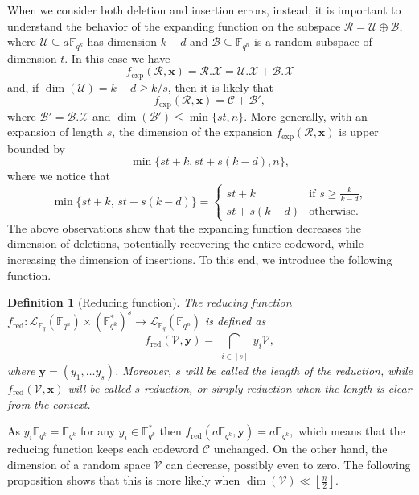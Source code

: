 \documentclass{article}
\newtheorem{definition}{Definition}
\newcommand{\Fq}{\mathbb{F}_{q}}
\newcommand{\Fqn}{\mathbb{F}_{q^n}}
\newcommand{\Fqk}{\mathbb{F}_{q^k}}
\newcommand{\calB}{\mathcal{B}}
\newcommand{\calC}{\mathcal{C}}
\newcommand{\calL}{\mathcal{L}}
\newcommand{\calR}{\mathcal{R}}
\newcommand{\calU}{\mathcal{U}}
\newcommand{\calV}{\mathcal{V}}
\newcommand{\calX}{\mathcal{X}}
\newcommand{\fred}{f_{\mathrm{red}}}
\newcommand{\fexp}{f_{\mathrm{exp}}}
\begin{document}
\par When we consider both deletion and insertion errors, instead, it is important to understand the behavior of the expanding function on the subspace 
$
    \calR = \calU \oplus \calB,
$
where $\calU \subseteq a\Fqk$ has dimension $k-d$ and $\calB \subseteq \Fqn$ is a random subspace of dimension $t.$
In this case we have
$$
    \fexp(\calR, \bm x) = \calR .\calX = \calU.\calX + \calB.\calX
$$
and, if $\dim(\calU) = k-d \geq k/s$, then it is likely that
$$
   \fexp(\calR,\bm x) =\calC + \calB',
$$
where $\calB'=\calB.\calX $ and $\dim(\calB') \leq \min \{st, n \}.$ 
More generally, with an expansion of length $s$, the dimension of the expansion $\fexp(\calR, \bm x)$ is upper bounded by
\begin{equation}
    \label{eq: dim_exp}
    \min\{ st + k, st + s(k-d), n\},
\end{equation}
where we notice that
\begin{equation}
    \label{eq: min upper bound on dimension of expansion}
    \min\{st + k,\, st + s(k-d)\}
=
\begin{cases}
st + k & \text{if } s \ge \frac{k}{k-d}, \\
st + s(k-d) & \text{otherwise}.
\end{cases}
\end{equation}
The above observations show that the expanding function decreases the dimension of deletions, potentially recovering the entire codeword, while increasing the dimension of insertions. To this end, we introduce the following function.
\begin{definition}[Reducing function]
    The reducing function 
\(
\fred:\calL_{\Fq}(\Fqn)\times (\Fqk^*)^s\longrightarrow \calL_{\Fq}(\Fqn)
\)
is defined as
\[
\fred(\calV,\bm y)
   = \bigcap_{\substack{i\in [s]}} y_i\calV,
\]
where $\bm y=(y_1,\ldots y_s)$. Moreover, $s$ will be called the length of the reduction, while $\fred(\calV, \bm x)$ will be called $s$-reduction, or simply reduction when the length is clear from the context.
\end{definition}
As $y_i \Fqk= \Fqk$ for any $y_i \in \Fqk^*$ then $\fred(a \Fqk, \bm y) = a \Fqk,$ which means that the reducing function keeps each codeword  $\calC$ unchanged.
On the other hand, the dimension of a random space $\calV$ can decrease, possibly even to zero. The following proposition shows that this is more likely when $\dim(\calV)\ll \left\lfloor\frac{n}{2}\right\rfloor$.
\end{document}
